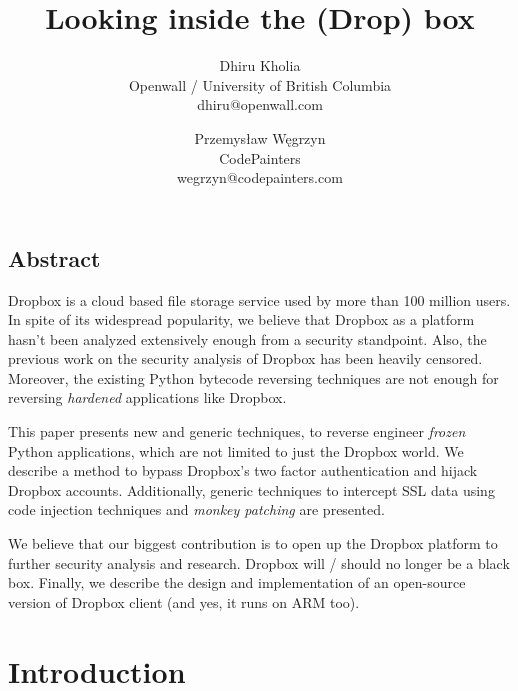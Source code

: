 \documentclass[letterpaper,twocolumn,10pt]{article}
\begin{document}
\date{}

\title{\Large \bf Looking inside the (Drop) box}

\author{ {\rm Dhiru Kholia}\\ Openwall / University of British Columbia \\
{\rm dhiru@openwall.com} \and {\rm Przemysław Węgrzyn}\\ CodePainters \\ {\rm
wegrzyn@codepainters.com} }

\maketitle

\pagestyle{empty}

\subsection*{Abstract}

Dropbox is a cloud based file storage service used by more than 100 million
users. In spite of its widespread popularity, we believe that Dropbox as a
platform hasn't been analyzed extensively enough from a security standpoint.
Also, the previous work on the security analysis of Dropbox has been heavily
censored. Moreover, the existing Python bytecode reversing techniques are not
enough for reversing \emph{hardened} applications like Dropbox.

This paper presents new and generic techniques, to reverse engineer
\emph{frozen} Python applications, which are not limited to just the Dropbox
world. We describe a method to bypass Dropbox's two factor authentication and
hijack Dropbox accounts. Additionally, generic techniques to intercept SSL data
using code injection techniques and \emph{monkey patching} are presented.

We believe that our biggest contribution is to open up the Dropbox platform to
further security analysis and research. Dropbox will / should no longer be a
black box. Finally, we describe the design and implementation of an open-source
version of Dropbox client (and yes, it runs on ARM too).

\section{Introduction}
\end{document}
